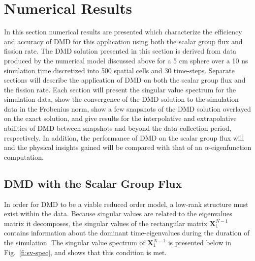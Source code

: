 \documentclass{style/nseJournal}
\newcommand{\FI}[1]{Fig.~\ref{fi:#1}}
\begin{document}
\section{Numerical Results}
In this section numerical results are presented which characterize the efficiency and accuracy of DMD for this application using both the scalar group flux and fission rate.  
The DMD solution presented in this section is derived from data produced by the numerical model discussed above for a 5 cm sphere over a 10 ns simulation time discretized into 500 spatial cells and 30 time-steps.  
Separate sections will describe the application of DMD on both the scalar group flux and the fission rate.  
Each section will present the singular value spectrum for the simulation data, show the convergence of the DMD solution to the simulation data in the Frobenius norm, show a few snapshots of the DMD solution overlayed on the exact solution, and give results for the interpolative and extrapolative abilities of DMD between snapshots and beyond the data collection period, respectively.  
In addition, the performance of DMD on the scalar group flux will and the physical insights gained will be compared with that of an $\alpha$-eigenfunction computation.  

\subsection{DMD with the Scalar Group Flux}
In order for DMD to be a viable reduced order model, a low-rank structure must exist within the data.  
Because singular values are related to the eigenvalues matrix it decomposes, the singular values of the rectangular matrix $\bm{X}^{N-1}_1$ contains information about the dominant time-eigenvalues during the duration of the simulation.  
The singular value spectrum of  $\bm{X}^{N-1}_1$ is presented below in \FI{sv-spec}, and shows that this condition is met.  
\end{document}
